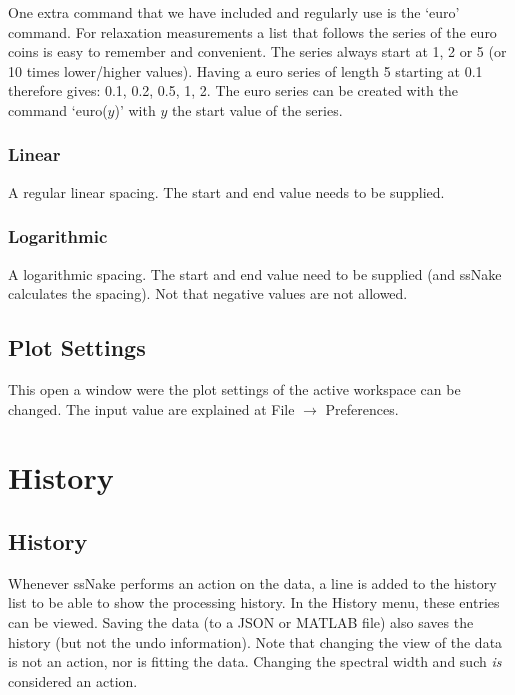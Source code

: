\documentclass[11pt,a4paper]{article}
\begin{document}
One extra command that we have included and regularly use is the `euro' command. For relaxation measurements a
list that follows the series of the euro coins is easy to remember and convenient. The series always start at
1, 2 or 5 (or 10 times lower/higher values). Having a euro series of length 5 starting at 0.1 therefore gives:
0.1, 0.2, 0.5, 1, 2. The euro series can be created with the command `euro($y$)' with $y$ the start value of
the series.



\subsubsection{Linear}
A regular linear spacing. The start and end value needs to be supplied.

\subsubsection{Logarithmic}
A logarithmic spacing. The start and end value need to be supplied (and ssNake calculates the spacing). Not
that negative values are not allowed.

\subsection{Plot Settings}
This open a window were the plot settings of the active workspace can be changed. The input value are explained
at File $\rightarrow$ Preferences.


\section{History}
\subsection{History}
Whenever ssNake performs an action on the data, a line is added to the history list to be able to show the processing history. In the History menu, these
entries can be viewed. Saving the data (to a JSON or MATLAB file) also saves the history (but not the undo information). Note that changing the view of the data
is not an action, nor is fitting the data. Changing the spectral width and such \textit{is} considered an action.
\end{document}
